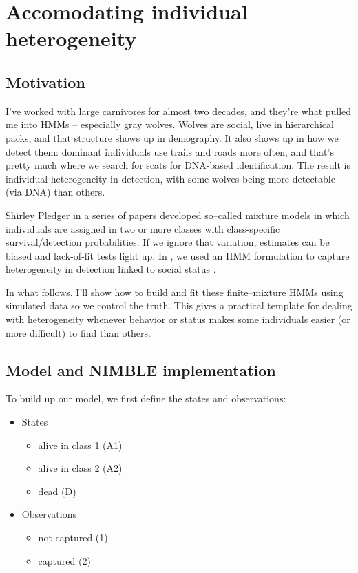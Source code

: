 \documentclass[
  12pt,
]{krantz}
\providecommand{\tightlist}{%
  \setlength{\itemsep}{0pt}\setlength{\parskip}{0pt}}
\begin{document}
\section{Accomodating individual heterogeneity}\label{indhet}

\subsection{Motivation}\label{motivation-5}

I've worked with large carnivores for almost two decades, and they're what pulled me into HMMs -- especially gray wolves. Wolves are social, live in hierarchical packs, and that structure shows up in demography. It also shows up in how we detect them: dominant individuals use trails and roads more often, and that's pretty much where we search for scats for DNA-based identification. The result is individual heterogeneity in detection, with some wolves being more detectable (via DNA) than others.

Shirley Pledger in a series of papers developed so--called mixture models in which individuals are assigned in two or more classes with class-specific survival/detection probabilities. If we ignore that variation, estimates can be biased and lack-of-fit tests light up. In \citet{cubaynes_importance_2010}, we used an HMM formulation to capture heterogeneity in detection linked to social status \citep[see also][]{pradel2009}.

In what follows, I'll show how to build and fit these finite--mixture HMMs using simulated data so we control the truth. This gives a practical template for dealing with heterogeneity whenever behavior or status makes some individuals easier (or more difficult) to find than others.

\subsection{Model and NIMBLE implementation}\label{model-and-nimble-implementation-5}

To build up our model, we first define the states and observations:

\begin{itemize}
\tightlist
\item
  States

  \begin{itemize}
  \tightlist
  \item
    alive in class 1 (A1)
  \item
    alive in class 2 (A2)
  \item
    dead (D)
  \end{itemize}
\item
  Observations

  \begin{itemize}
  \tightlist
  \item
    not captured (1)
  \item
    captured (2)
  \end{itemize}
\end{itemize}
\end{document}
